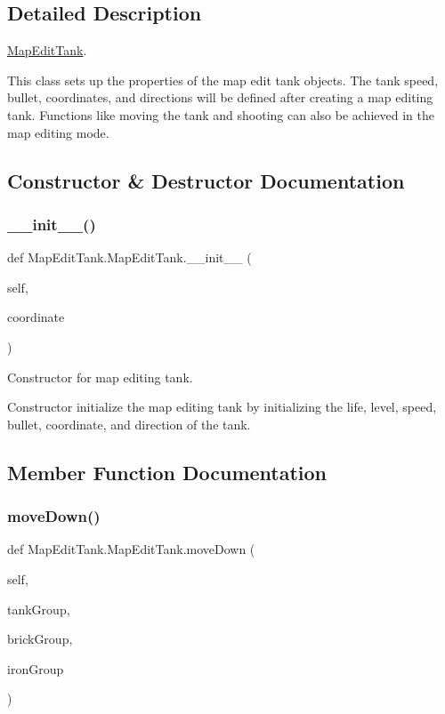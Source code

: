 \subsection{Detailed Description}
\mbox{\hyperlink{class_map_edit_tank_1_1_map_edit_tank}{Map\+Edit\+Tank}}. 

This class sets up the properties of the map edit tank objects. The tank speed, bullet, coordinates, and directions will be defined after creating a map editing tank. Functions like moving the tank and shooting can also be achieved in the map editing mode. 

\subsection{Constructor \& Destructor Documentation}
\mbox{\label{class_map_edit_tank_1_1_map_edit_tank_ad8cc111facbee74fb18dceb311326a41}} 
\subsubsection{\texorpdfstring{\_\_init\_\_()}{\_\_init\_\_()}}
{\footnotesize\ttfamily def Map\+Edit\+Tank.\+Map\+Edit\+Tank.\+\_\+\+\_\+init\+\_\+\+\_\+ (\begin{DoxyParamCaption}\item[{}]{self,  }\item[{}]{coordinate }\end{DoxyParamCaption})}



Constructor for map editing tank. 

Constructor initialize the map editing tank by initializing the life, level, speed, bullet, coordinate, and direction of the tank. 

\subsection{Member Function Documentation}
\mbox{\label{class_map_edit_tank_1_1_map_edit_tank_a5777197d894d3766aa2154cfea70aad6}} 
\subsubsection{\texorpdfstring{moveDown()}{moveDown()}}
{\footnotesize\ttfamily def Map\+Edit\+Tank.\+Map\+Edit\+Tank.\+move\+Down (\begin{DoxyParamCaption}\item[{}]{self,  }\item[{}]{tank\+Group,  }\item[{}]{brick\+Group,  }\item[{}]{iron\+Group }\end{DoxyParamCaption})}



